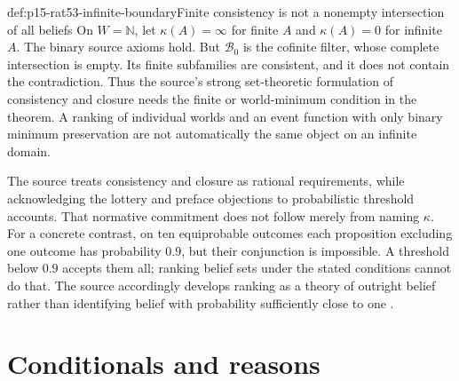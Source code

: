 \begin{hbexample}{def:p15-rat53-infinite-boundary}{Finite consistency is not a nonempty intersection of all beliefs}
On \(W=\mathbb N\), let \(\kappa(A)=\infty\) for finite \(A\) and
\(\kappa(A)=0\) for infinite \(A\).  The binary source axioms hold.
But \(\mathcal B_0\) is the cofinite filter, whose complete intersection
is empty.  Its finite subfamilies are consistent, and it does not contain
the contradiction.  Thus the source's strong set-theoretic formulation of
consistency and closure needs the finite or world-minimum condition in the
theorem.  A ranking of individual worlds and an event function with only
binary minimum preservation are not automatically the same object on an
infinite domain.
\end{hbexample}

The source treats consistency and closure as rational requirements, while
acknowledging the lottery and preface objections to probabilistic threshold
accounts.  That normative commitment does not follow merely from naming
\(\kappa\).  For a concrete contrast, on ten equiprobable outcomes each
proposition excluding one outcome has probability \(0.9\), but their
conjunction is impossible.  A threshold below \(0.9\) accepts them all;
ranking belief sets under the stated conditions cannot do that.
The source accordingly develops ranking as a theory of outright belief
rather than identifying belief with probability sufficiently close to one
\parencite[pp.~338, 341]{KernIsbernerSkovgaardOlsenSpohn2021Ranking}.

\section{Conditionals and reasons}

